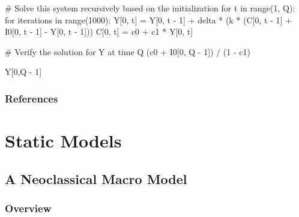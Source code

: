\documentclass[
  letterpaper,
  DIV=11,
  numbers=noendperiod]{scrreprt}
\newenvironment{Shaded}{\begin{snugshade}}{\end{snugshade}}
\newcommand{\BuiltInTok}[1]{\textcolor[rgb]{0.00,0.23,0.31}{#1}}
\newcommand{\CommentTok}[1]{\textcolor[rgb]{0.37,0.37,0.37}{#1}}
\newcommand{\ControlFlowTok}[1]{\textcolor[rgb]{0.00,0.23,0.31}{#1}}
\newcommand{\DecValTok}[1]{\textcolor[rgb]{0.68,0.00,0.00}{#1}}
\newcommand{\KeywordTok}[1]{\textcolor[rgb]{0.00,0.23,0.31}{#1}}
\newcommand{\NormalTok}[1]{\textcolor[rgb]{0.00,0.23,0.31}{#1}}
\newcommand{\OperatorTok}[1]{\textcolor[rgb]{0.37,0.37,0.37}{#1}}
\begin{document}
\begin{tcolorbox}
\begin{Shaded}
\begin{Highlighting}[]
\CommentTok{\# Solve this system recursively based on the initialization}
\ControlFlowTok{for}\NormalTok{ t }\KeywordTok{in} \BuiltInTok{range}\NormalTok{(}\DecValTok{1}\NormalTok{, Q):}
    \ControlFlowTok{for}\NormalTok{ iterations }\KeywordTok{in} \BuiltInTok{range}\NormalTok{(}\DecValTok{1000}\NormalTok{):}
\NormalTok{        Y[}\DecValTok{0}\NormalTok{, t] }\OperatorTok{=}\NormalTok{ Y[}\DecValTok{0}\NormalTok{, t }\OperatorTok{{-}} \DecValTok{1}\NormalTok{] }\OperatorTok{+}\NormalTok{ delta }\OperatorTok{*}\NormalTok{ (k }\OperatorTok{*}\NormalTok{ (C[}\DecValTok{0}\NormalTok{, t }\OperatorTok{{-}} \DecValTok{1}\NormalTok{] }\OperatorTok{+}\NormalTok{ I0[}\DecValTok{0}\NormalTok{, t }\OperatorTok{{-}} \DecValTok{1}\NormalTok{] }\OperatorTok{{-}}\NormalTok{ Y[}\DecValTok{0}\NormalTok{, t }\OperatorTok{{-}} \DecValTok{1}\NormalTok{]))}
\NormalTok{        C[}\DecValTok{0}\NormalTok{, t] }\OperatorTok{=}\NormalTok{ c0 }\OperatorTok{+}\NormalTok{ c1 }\OperatorTok{*}\NormalTok{ Y[}\DecValTok{0}\NormalTok{, t]}

\CommentTok{\# Verify the solution for Y at time Q}
\NormalTok{(c0 }\OperatorTok{+}\NormalTok{ I0[}\DecValTok{0}\NormalTok{, Q }\OperatorTok{{-}} \DecValTok{1}\NormalTok{]) }\OperatorTok{/}\NormalTok{ (}\DecValTok{1} \OperatorTok{{-}}\NormalTok{ c1)}

\NormalTok{Y[}\DecValTok{0}\NormalTok{,Q }\OperatorTok{{-}} \DecValTok{1}\NormalTok{]}
\end{Highlighting}
\end{Shaded}

\end{tcolorbox}

\section{References}\label{references}

\part{Static Models}

\chapter{A Neoclassical Macro Model}\label{sec-neoclassical-model}

\section{Overview}\label{overview}
\end{document}
